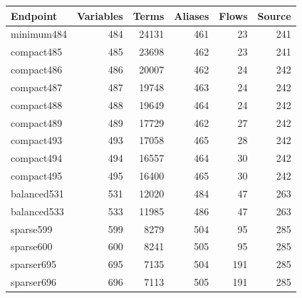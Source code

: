 \begin{center}\small
\begin{tabular}{@{}lrrrrr@{}}\toprule
Endpoint & Variables & Terms & Aliases & Flows & Source\\\midrule
minimum484 & 484 & 24131 & 461 & 23 & 241\\
compact485 & 485 & 23698 & 462 & 23 & 241\\
compact486 & 486 & 20007 & 462 & 24 & 242\\
compact487 & 487 & 19748 & 463 & 24 & 242\\
compact488 & 488 & 19649 & 464 & 24 & 242\\
compact489 & 489 & 17729 & 462 & 27 & 242\\
compact493 & 493 & 17058 & 465 & 28 & 242\\
compact494 & 494 & 16557 & 464 & 30 & 242\\
compact495 & 495 & 16400 & 465 & 30 & 242\\
balanced531 & 531 & 12020 & 484 & 47 & 263\\
balanced533 & 533 & 11985 & 486 & 47 & 263\\
sparse599 & 599 & 8279 & 504 & 95 & 285\\
sparse600 & 600 & 8241 & 505 & 95 & 285\\
sparser695 & 695 & 7135 & 504 & 191 & 285\\
sparser696 & 696 & 7113 & 505 & 191 & 285\\
\bottomrule\end{tabular}
\end{center}
